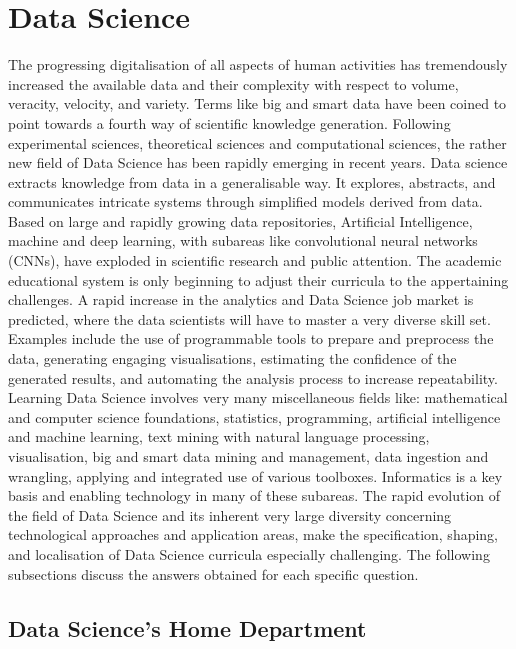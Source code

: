 \section{Data Science}

The progressing digitalisation of all aspects of human activities has tremendously increased the available data and their complexity with respect to volume, veracity, velocity, and variety. Terms like big and smart data have been coined to point towards a fourth way of scientific knowledge generation. Following experimental sciences, theoretical sciences and computational sciences, the rather new field of Data Science has been rapidly emerging in recent years. Data science extracts knowledge from data in a generalisable way. It explores, abstracts, and communicates intricate systems through simplified models derived from data. Based on large and rapidly growing data repositories, Artificial Intelligence, machine and deep learning, with subareas like convolutional neural networks (CNNs), have exploded in scientific research and public attention. The academic educational system is only beginning to adjust their curricula to the appertaining challenges. A rapid increase in the analytics and Data Science job market is predicted, where the data scientists will have to master a very diverse skill set. Examples include the use of programmable tools to prepare and preprocess the data, generating engaging visualisations, estimating the confidence of the generated results, and automating the analysis process to increase repeatability. Learning Data Science involves very many miscellaneous fields like: mathematical and computer science foundations, statistics, programming, artificial intelligence and machine learning, text mining with natural language processing, visualisation, big and smart data mining and management, data ingestion and wrangling, applying and integrated use of various toolboxes. Informatics is a key basis and enabling technology in many of these subareas. The rapid evolution of the field of Data Science and its inherent very large diversity concerning technological approaches and application areas, make the specification, shaping, and localisation of Data Science curricula especially challenging. The 
following subsections discuss the answers obtained for each specific
question.

\subsection{Data Science's Home Department}

